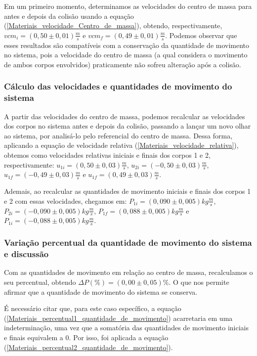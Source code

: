 \documentclass[12pt, twoside]{article}
\begin{document}
    Em um primeiro momento, determinamos as velocidades do centro de massa para antes e depois da colisão usando a equação (\ref{Materiais_velocidade_Centro_de_massa}), obtendo, respectivamente, $vcm_{i} = (0,50 \pm 0,01)\frac{m}{s}$ e $vcm_{f} = (0,49 \pm 0,01)\frac{m}{s}$. Podemos observar que esses resultados são compatíveis com a conservação da quantidade de movimento no sistema, pois a velocidade do centro de massa (a qual considera o movimento de ambos corpos envolvidos) praticamente não sofreu alteração após a colisão.
    
\subsubsection{Cálculo das velocidades e quantidades de movimento do sistema}
\label{novasVelocidades}

    A partir das velocidades do centro de massa, podemos recalcular as velocidades dos corpos no sistema antes e depois da colisão, passando a lançar um novo olhar ao sistema, por analisá-lo pelo referencial do centro de massa. Dessa forma, aplicando a equação de velocidade relativa (\ref{Materiais_velocidade_relativa}), obtemos como velocidades relativas iniciais e finais dos corpos 1 e 2, respectivamente: $u_{1i} = (0,50 \pm 0,03)\frac{m}{s}$, $u_{2i} = (-0,50 \pm 0,03)\frac{m}{s}$, $u_{1f} = (-0,49 \pm 0,03)\frac{m}{s}$ e $u_{1f} = (0,49 \pm 0,03)\frac{m}{s}$.

    Ademais, ao recalcular as quantidades de movimento iniciais e finais dos corpos 1 e 2 com essas velocidades, chegamos em: $P_{1i} = (0,090 \pm 0,005) kg\frac{m}{s}$, $P_{2i} = (-0,090 \pm 0,005) kg\frac{m}{s}$, $P_{1f} = (0,088 \pm 0,005) kg\frac{m}{s}$ e $P_{1i} = (-0,088 \pm 0,005) kg\frac{m}{s}$. 

\subsubsection{Variação percentual da quantidade de movimento do sistema e discussão}

    Com as quantidades de movimento em relação ao centro de massa, recalculamos o seu percentual, obtendo $\Delta P(\%) = (0,00 \pm 0,05)\%$. O que nos permite afirmar que a quantidade de movimento do sistema se conserva.

    É necessário citar que, para este caso específico, a equação (\ref{Materiais_percentual1_quantidade_de_movimento}) acarretaria em uma indeterminação, uma vez que a somatória das quantidades de movimento iniciais e finais equivalem a $0$. Por isso, foi aplicada a equação (\ref{Materiais_percentual2_quantidade_de_movimento}).
\end{document}
